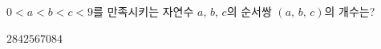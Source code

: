 $0<a<b<c<9$를 만족시키는 자연수 $a$, $b$, $c$의 순서쌍 $(a,\,b,\,c)$의 개수는?
\begin{choices32}{$28$}{$42$}{$56$}{$70$}{$84$}\end{choices32}
